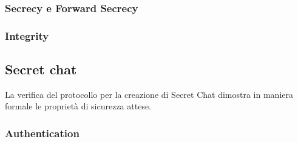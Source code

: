 \subsubsection{Secrecy e Forward Secrecy}







\subsubsection{Integrity}






\subsection{Secret chat}
La verifica del protocollo per la creazione di Secret Chat dimostra in maniera formale le proprietà di sicurezza attese.

\subsubsection{Authentication}

